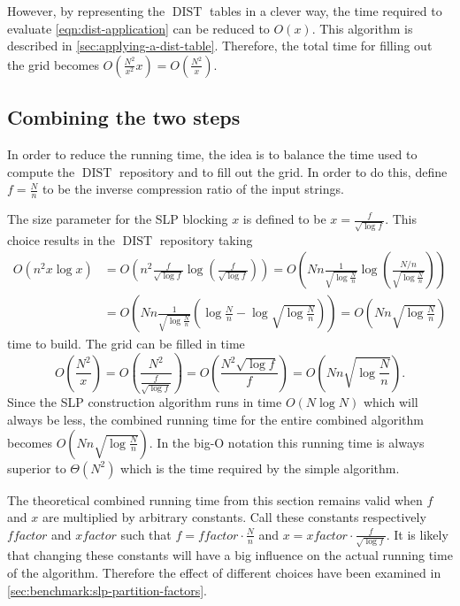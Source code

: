 \documentclass[twoside,11pt,openright]{report}
\newcommand{\DIST}{\operatorname{DIST}}
\newcommand{\xfactor}{\ensuremath{\mathit{xfactor}}}
\newcommand{\ffactor}{\ensuremath{\mathit{ffactor}}}
\begin{document}
However, by representing the $\DIST$ tables in a clever way, the time required to evaluate \cref{eqn:dist-application} can be reduced to $O(x)$. This algorithm is described in \cref{sec:applying-a-dist-table}. Therefore, the total time for filling out the grid becomes $O\left( \frac{N^2}{x^2}x \right) = O\left( \frac{N^2}{x} \right)$.

\subsection{Combining the two steps}
\label{sec:combining-the-two-steps}
In order to reduce the running time, the idea is to balance the time used to compute the $\DIST$ repository and to fill out the grid. In order to do this, define $f = \frac{N}{n}$ to be the inverse compression ratio of the input strings.

The size parameter for the SLP blocking $x$ is defined to be $x = \frac{f}{\sqrt{\log{f}}}$. This choice results in the $\DIST$ repository taking
\begin{align*}
  O(n^2 x\log{x})
    &= O\left( n^2 \frac{f}{\sqrt{\log{f}}} \log\left( \frac{f}{\sqrt{\log{f}}} \right) \right)
    = O\left( Nn \frac{1}{\sqrt{\log{\frac{N}{n}}}} \log\left( \frac{N/n}{\sqrt{\log{\frac{N}{n}}}} \right) \right) \\
    &= O\left( Nn \frac{1}{\sqrt{\log{\frac{N}{n}}}} \left( \log{\frac{N}{n}} - \log{\sqrt{\log{\frac{N}{n}}}} \right) \right)
    = O\left( Nn\sqrt{\log{\frac{N}{n}}} \right)
\end{align*}
time to build. The grid can be filled in time
\[
  O\left(\frac{N^2}{x}\right)
    = O\left( \frac{N^2}{\frac{f}{\sqrt{\log{f}}}} \right)
    = O\left( \frac{N^2 \sqrt{\log{f}}}{f} \right)
    = O\left( Nn\sqrt{\log{\frac{N}{n}}} \right).
\]
Since the SLP construction algorithm runs in time $O(N\log{N})$ which will always be less, the combined running time for the entire combined algorithm becomes $O\left( Nn\sqrt{\log{\frac{N}{n}}} \right)$. In the big-O notation this running time is always superior to $\Theta(N^2)$ which is the time required by the simple algorithm.

The theoretical combined running time from this section remains valid when $f$ and $x$ are multiplied by arbitrary constants. Call these constants respectively $\ffactor$ and $\xfactor$ such that $f = \ffactor \cdot \frac{N}{n}$ and $x = \xfactor \cdot \frac{f}{\sqrt{\log{f}}}$. It is likely that changing these constants will have a big influence on the actual running time of the algorithm. Therefore the effect of different choices have been examined in \cref{sec:benchmark:slp-partition-factors}.
\end{document}
